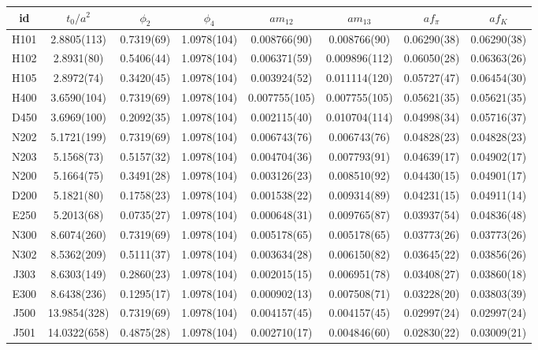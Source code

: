 \begin{sidewaystable}
\begin{center}
    \begin{tabular}{c c c c c c c c}
id & $t_0/a^2$ & $\phi_2$ & $\phi_4$ & $am_{12}$ & $am_{13}$ & $af_{\pi}$ & $af_K$ \\
\toprule
H101 & 2.8805(113) & 0.7319(69) & 1.0978(104) & 0.008766(90) & 0.008766(90) & 0.06290(38) & 0.06290(38) \\
H102 & 2.8931(80) & 0.5406(44) & 1.0978(104) & 0.006371(59) & 0.009896(112) & 0.06050(28) & 0.06363(26) \\
H105 & 2.8972(74) & 0.3420(45) & 1.0978(104) & 0.003924(52) & 0.011114(120) & 0.05727(47) & 0.06454(30) \\
\midrule
H400 & 3.6590(104) & 0.7319(69) & 1.0978(104) & 0.007755(105) & 0.007755(105) & 0.05621(35) & 0.05621(35) \\
D450 & 3.6969(100) & 0.2092(35) & 1.0978(104) & 0.002115(40) & 0.010704(114) & 0.04998(34) & 0.05716(37) \\
\midrule
N202 & 5.1721(199) & 0.7319(69) & 1.0978(104) & 0.006743(76) & 0.006743(76) & 0.04828(23) & 0.04828(23) \\
N203 & 5.1568(73) & 0.5157(32) & 1.0978(104) & 0.004704(36) & 0.007793(91) & 0.04639(17) & 0.04902(17) \\
N200 & 5.1664(75) & 0.3491(28) & 1.0978(104) & 0.003126(23) & 0.008510(92) & 0.04430(15) & 0.04901(17) \\
D200 & 5.1821(80) & 0.1758(23) & 1.0978(104) & 0.001538(22) & 0.009314(89) & 0.04231(15) & 0.04911(14) \\
E250 & 5.2013(68) & 0.0735(27) & 1.0978(104) & 0.000648(31) & 0.009765(87) & 0.03937(54) & 0.04836(48) \\
\midrule
N300 & 8.6074(260) & 0.7319(69) & 1.0978(104) & 0.005178(65) & 0.005178(65) & 0.03773(26) & 0.03773(26) \\
N302 & 8.5362(209) & 0.5111(37) & 1.0978(104) & 0.003634(28) & 0.006150(82) & 0.03645(22) & 0.03856(26) \\
J303 & 8.6303(149) & 0.2860(23) & 1.0978(104) & 0.002015(15) & 0.006951(78) & 0.03408(27) & 0.03860(18) \\
E300 & 8.6438(236) & 0.1295(17) & 1.0978(104) & 0.000902(13) & 0.007508(71) & 0.03228(20) & 0.03803(39) \\
\midrule
J500 & 13.9854(328) & 0.7319(69) & 1.0978(104) & 0.004157(45) & 0.004157(45) & 0.02997(24) & 0.02997(24) \\
J501 & 14.0322(658) & 0.4875(28) & 1.0978(104) & 0.002710(17) & 0.004846(60) & 0.02830(22) & 0.03009(21) \\

\end{tabular}
\end{center}
\end{sidewaystable}
